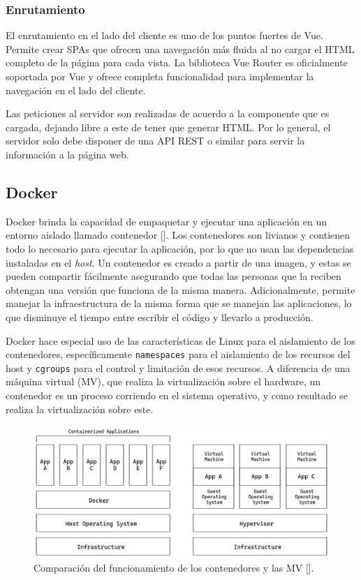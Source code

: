 \subsubsection{Enrutamiento} 

El enrutamiento en el lado del cliente es uno de los puntos fuertes de Vue. Permite crear SPAs que ofrecen una navegación más fluida al no cargar el HTML completo de la página para cada vista. La biblioteca Vue Router es oficialmente soportada por Vue y ofrece completa funcionalidad para implementar la navegación en el lado del cliente.

Las peticiones al servidor son realizadas de acuerdo a la componente que es cargada, dejando libre a este de tener que generar HTML. Por lo general, el servidor solo debe disponer de una API REST o similar para servir la información a la página web.

\subsection{Docker}\label{sec:docker}

Docker brinda la capacidad de empaquetar y ejecutar una aplicación en un entorno aislado llamado contenedor [\cite{docker-docs}]. Los contenedores son livianos y contienen todo lo necesario para ejecutar la aplicación, por lo que no usan las dependencias instaladas en el \textit{host}. Un contenedor es creado a partir de una imagen, y estas se pueden compartir fácilmente asegurando que todas las personas que la reciben obtengan una versión que funciona de la misma manera. Adicionalmente, permite manejar la infraestructura de la misma forma que se manejan las aplicaciones, lo que disminuye el tiempo entre escribir el código y llevarlo a producción.

Docker hace especial uso de las características de Linux para el aislamiento de los contenedores, específicamente \verb|namespaces| para el aislamiento de los recursos del host y \verb|cgroups| para el control y limitación de esos recursos. A diferencia de una máquina virtual (MV), que realiza la virtualización sobre el hardware, un contenedor es un proceso corriendo en el sistema operativo, y como resultado se realiza la virtualización sobre este.

\begin{figure}[!ht]
    \centering
    \includegraphics[width=\linewidth]{draws/cont-vs-vm.png}
    \caption{Comparación del funcionamiento de los contenedores y las MV [\cite{docker-containers}].}
\end{figure}


